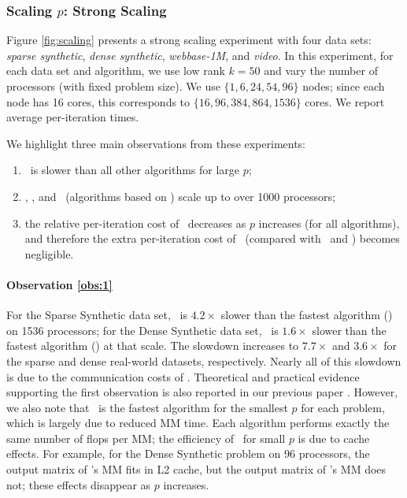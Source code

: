 \subsubsection{Scaling \texorpdfstring{$p$}{p}: Strong Scaling}
\label{sec:scaling}

Figure \ref{fig:scaling} presents a strong scaling experiment with four data sets: \emph{sparse synthetic}, \emph{dense synthetic}, \emph{webbase-1M}, and \emph{video}.
In this experiment, for each data set and algorithm, we use low rank $k=50$ and vary the number of processors (with fixed problem size).
We use $\{1,6,24,54,96\}$ nodes; since each node has 16 cores, this corresponds to $\{16,96,384,864,1536\}$ cores.
We report average per-iteration times.

We highlight three main observations from these experiments:
\begin{enumerate}
	\item \label{obs:1} \Naive\ is slower than all other algorithms for large $p$;
	\item \label{obs:2} \MU, \HALS, and \BPP\ (algorithms based on \ParNMF) scale up to over 1000 processors;
	\item \label{obs:3} the relative per-iteration cost of \LUC\ decreases as $p$ increases (for all algorithms), and therefore the extra per-iteration cost of \BPP\ (compared with \MU\ and \HALS) becomes negligible.
\end{enumerate}

\paragraph{Observation \ref{obs:1}} 
For the Sparse Synthetic data set, \Naive\ is $4.2\times$ slower than the fastest algorithm (\BPP) on 1536 processors; for the Dense Synthetic data set, \Naive\ is $1.6\times$ slower than the fastest algorithm (\MU) at that scale.
The slowdown increases to $7.7\times$ and $3.6\times$ for the sparse and dense real-world datasets, respectively.
Nearly all of this slowdown is due to the communication costs of \Naive.
Theoretical and practical evidence supporting the first observation is also reported in our previous paper \cite{KBP16}.
However, we also note that \Naive\ is the fastest algorithm for the smallest $p$ for each problem, which is largely due to reduced MM time.
Each algorithm performs exactly the same number of flops per MM; the efficiency of \Naive\ for small $p$ is due to cache effects.
For example, for the Dense Synthetic problem on 96 processors, the output matrix of \Naive's MM fits in L2 cache, but the output matrix of \ParNMF's MM does not; these effects disappear as $p$ increases.


